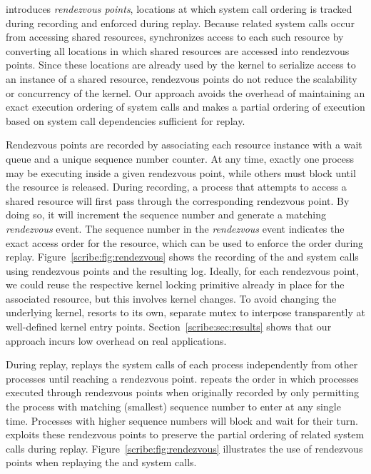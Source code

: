 \begin{table}[]
\scribe{} introduces {\em rendezvous points}, locations at which
system call ordering is tracked during recording and enforced during
replay.  Because related system calls occur from accessing shared
resources, \scribe{} synchronizes access to each such resource by
converting all locations in which shared resources are accessed into
rendezvous points.  Since these locations are already used by the
kernel to serialize access to an instance of a shared resource,
rendezvous points do not reduce the scalability or concurrency of the
kernel.  Our approach avoids the overhead of maintaining an exact
execution ordering of system calls and makes a partial ordering of
execution based on system call dependencies sufficient for replay.

  

Rendezvous points are recorded by associating each resource instance 
with a wait queue and a unique sequence number counter. At
any time, exactly one process may be executing inside a given
rendezvous point, while others must block until the resource is
released.  During recording, a process that attempts to access a
shared resource will first pass through the corresponding rendezvous
point.  By doing so, it will increment the sequence number and
generate a matching {\em rendezvous} event. The sequence number in the
{\em rendezvous} event indicates the exact access order for the
resource, which can be used to enforce the order during replay.
Figure~\ref{scribe:fig:rendezvous} shows the recording of
the  and  system calls using rendezvous points
and the resulting log. 
Ideally, for each rendezvous point, we could reuse the respective
kernel locking primitive already in place for the associated
resource, but this involves kernel changes.  To avoid changing the
underlying kernel, \scribe{} resorts to its own, separate mutex to
interpose transparently at well-defined kernel entry points.
Section~\ref{scribe:sec:results} shows that our approach incurs low overhead
on real applications. 

During replay, \scribe{} replays the system calls of each process
independently from other processes until reaching a rendezvous point.
\scribe{} repeats the order in which processes executed through
rendezvous points when originally recorded by only permitting the
process with matching (smallest) sequence number to enter at any
single time. Processes with higher sequence numbers will block and
wait for their turn.  \scribe{} exploits these rendezvous points to
preserve the partial ordering of related system calls during replay.
Figure~\ref{scribe:fig:rendezvous} illustrates the use of rendezvous points
when replaying the  and  system calls.


\end{table}
